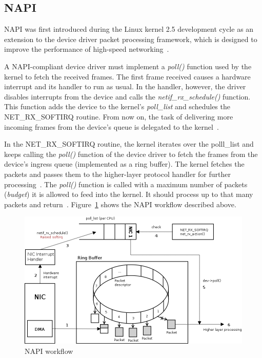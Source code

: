 
\subsection{NAPI}\label{subsec:linux-ingress-napi}
NAPI was first introduced during the Linux kernel 2.5 development cycle as
an extension to the device driver packet processing framework,
which is designed to improve the performance of high-speed networking~\cite{linux-foundation-napi}.

A NAPI-compliant device driver must implement a {\it{poll()}} function used by the kernel to fetch the received frames.
The first frame received causes a hardware interrupt and its handler to run as usual.
In the handler, however, the driver disables interrupts from the device
and calls the {\it{netif\_rx\_schedule()}} function.
This function adds the device to the kernel's {\it{poll\_list}} and schedules the NET\_RX\_SOFTIRQ routine.
From now on, the task of delivering more incoming frames from
the device's queue is delegated to the kernel~\cite{understanding-internals}.

In the NET\_RX\_SOFTIRQ routine, the kernel iterates over the polll\_list and keeps calling
the {\it{poll()}} function of the device driver to fetch the frames from the device's ingress queue (implemented as a ring buffer).
The kernel fetches the packets and passes them to the higher-layer protocol handler for further processing~\cite{linux-kernel-networking}.
The {\it{poll()}} function is called with a maximum number
of packets ({\it{budget}}) it is allowed to feed into the kernel.
It should process up to that many packets and return~\cite{reworking-napi}.
Figure~\ref{fig:linux-napi-workflow} shows the NAPI workflow described above.

\begin{figure}
	\centering
	\includegraphics[width=15cm,keepaspectratio]{fig/napi-workflow.png}
	\caption{NAPI workflow}
	\label{fig:linux-napi-workflow}
\end{figure}

